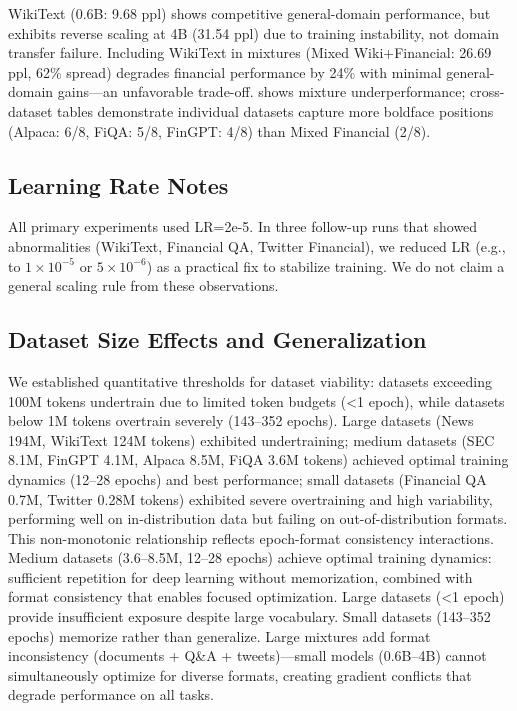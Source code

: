 WikiText (0.6B: 9.68 ppl) shows competitive general-domain performance, but exhibits reverse scaling at 4B (31.54 ppl) due to training instability, not domain transfer failure. Including WikiText in mixtures (Mixed Wiki+Financial: 26.69 ppl, 62\% spread) degrades financial performance by 24\% with minimal general-domain gains—an unfavorable trade-off.  shows mixture underperformance; cross-dataset tables demonstrate individual datasets capture more boldface positions (Alpaca: 6/8, FiQA: 5/8, FinGPT: 4/8) than Mixed Financial (2/8).

\subsection{Learning Rate Notes}

All primary experiments used LR=2e-5. In three follow-up runs that showed abnormalities (WikiText, Financial QA, Twitter Financial), we reduced LR (e.g., to $1\times10^{-5}$ or $5\times10^{-6}$) as a practical fix to stabilize training. We do not claim a general scaling rule from these observations.

\subsection{Dataset Size Effects and Generalization}

We established quantitative thresholds for dataset viability: datasets exceeding 100M tokens undertrain due to limited token budgets (<1 epoch), while datasets below 1M tokens overtrain severely (143–352 epochs). Large datasets (News 194M, WikiText 124M tokens) exhibited undertraining; medium datasets (SEC 8.1M, FinGPT 4.1M, Alpaca 8.5M, FiQA 3.6M tokens) achieved optimal training dynamics (12–28 epochs) and best performance; small datasets (Financial QA 0.7M, Twitter 0.28M tokens) exhibited severe overtraining and high variability, performing well on in-distribution data but failing on out-of-distribution formats. This non-monotonic relationship reflects epoch-format consistency interactions. Medium datasets (3.6–8.5M, 12–28 epochs) achieve optimal training dynamics: sufficient repetition for deep learning without memorization, combined with format consistency that enables focused optimization. Large datasets (<1 epoch) provide insufficient exposure despite large vocabulary. Small datasets (143–352 epochs) memorize rather than generalize. Large mixtures add format inconsistency (documents + Q\&A + tweets)—small models (0.6B–4B) cannot simultaneously optimize for diverse formats, creating gradient conflicts that degrade performance on all tasks.

